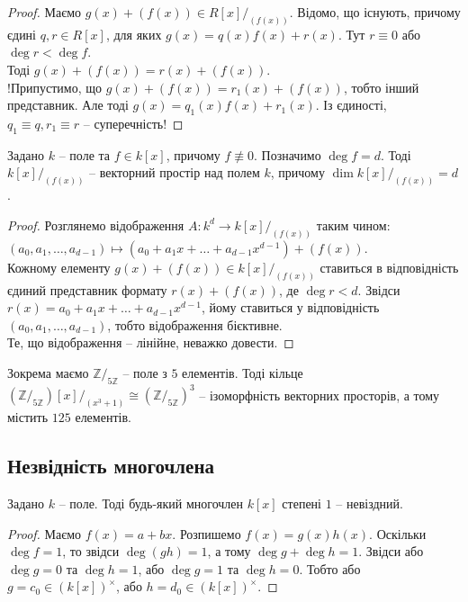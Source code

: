 \documentclass{math_library}
\begin{document}
\begin{proof}
Маємо $g(x) + (f(x)) \in R[x]/_{(f(x))}$. Відомо, що існують, причому єдині $q,r \in R[x]$, для яких $g(x) = q(x)f(x) + r(x)$. Тут $r \equiv 0$ або $\deg r < \deg f$.\\
Тоді $g(x) + (f(x)) = r(x) + (f(x))$.\\
!Припустимо, що $g(x) + (f(x)) = r_1(x) + (f(x))$, тобто інший представник. Але тоді $g(x) = q_1(x) f(x) + r_1(x)$. Із єдиності, $q_1 \equiv q, r_1 \equiv r$ -- суперечність!
\end{proof}

\begin{theorem}
Задано $k$ -- поле та $f \in k[x]$, причому $f \not\equiv 0$. Позначимо $\deg f = d$. Тоді $k[x]/_{(f(x))}$ -- векторний простір над полем $k$, причому $\dim k[x]/_{(f(x))} = d$.
\end{theorem}

\begin{proof}
Розглянемо відображення $A \colon k^d \to k[x]/_{(f(x))}$ таким чином:\\
$(a_0,a_1,\dots,a_{d-1}) \mapsto (a_0 + a_1 x + \dots + a_{d-1} x^{d-1}) + (f(x))$.\\
Кожному елементу $g(x) + (f(x)) \in k[x]/_{(f(x))}$ ставиться в відповідність єдиний представник формату $r(x) + (f(x))$, де $\deg r < d$. Звідси $r(x) = a_0 + a_1 x + \dots + a_{d-1} x^{d-1}$, йому ставиться у відповідність $(a_0,a_1,\dots,a_{d-1})$, тобто відображення бієктивне.\\
Те, що відображення -- лінійне, неважко довести.
\end{proof}

\begin{example}
Зокрема маємо $\mathbb{Z}/_{5 \mathbb{Z}}$ -- поле з $5$ елементів. Тоді кільце \\
$(\mathbb{Z}/_{5 \mathbb{Z}})[x]/_{(x^3+1)} \cong (\mathbb{Z}/_{5 \mathbb{Z}})^3$ -- ізоморфність векторних просторів, а тому містить $125$ елементів.
\end{example}

\subsection{Незвідність многочлена}
\begin{proposition}
\label{deg_one_polynomial_at_field}
Задано $k$ -- поле. Тоді будь-який многочлен $k[x]$ степені $1$ -- невіздний.
\end{proposition}

\begin{proof}
Маємо $f(x) = a + bx$. Розпишемо $f(x) = g(x)h(x)$. Оскільки $\deg f = 1$, то звідси $\deg (gh) = 1$, а тому $\deg g + \deg h = 1$. Звідси або $\deg g = 0$ та $\deg h = 1$, або $\deg g = 1$ та $\deg h = 0$. Тобто або $g =c_0 \in (k[x])^\times$, або $h = d_0 \in (k[x])^\times$.
\end{proof}
\end{document}
